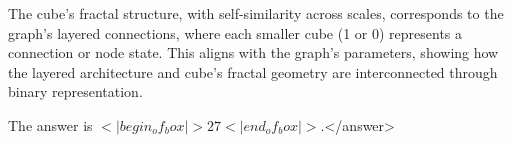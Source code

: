 The cube's fractal structure, with self-similarity across scales, corresponds to the graph's layered connections, where each smaller cube (1 or 0) represents a connection or node state. This aligns with the graph's parameters, showing how the layered architecture and cube's fractal geometry are interconnected through binary representation.  

The answer is \(<|begin_of_box|>27<|end_of_box|>\).</answer>
